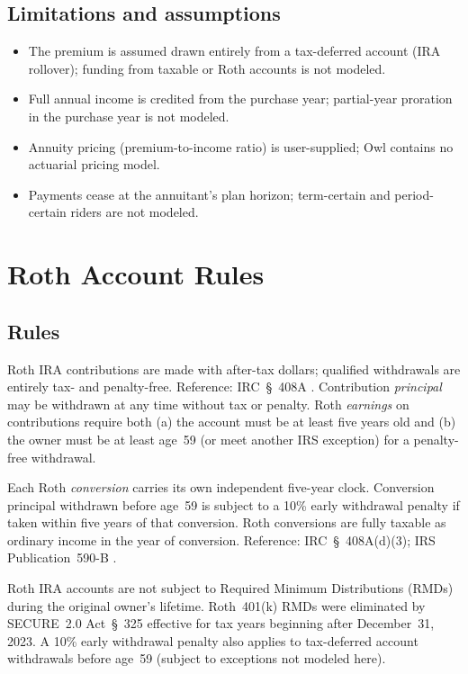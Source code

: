 \documentclass[fleqn,12pt]{report}
\begin{document}
\subsection*{Limitations and assumptions}

\begin{itemize}[nosep]
  \item The premium is assumed drawn entirely from a tax-deferred account (IRA
    rollover); funding from taxable or Roth accounts is not modeled.
  \item Full annual income is credited from the purchase year; partial-year
    proration in the purchase year is not modeled.
  \item Annuity pricing (premium-to-income ratio) is user-supplied; Owl
    contains no actuarial pricing model.
  \item Payments cease at the annuitant's plan horizon; term-certain and
    period-certain riders are not modeled.
\end{itemize}

\section{Roth Account Rules}
\label{sec:roth}

\subsection*{Rules}

Roth IRA contributions are made with after-tax dollars; qualified withdrawals
are entirely tax- and penalty-free.
Reference: IRC~§~408A \cite{irc408a}.
Contribution \emph{principal} may be withdrawn at any time without tax or
penalty.
Roth \emph{earnings} on contributions require both (a) the account must be at
least five years old and (b) the owner must be at least age~59\textonehalf{}
(or meet another IRS exception) for a penalty-free withdrawal.

Each Roth \emph{conversion} carries its own independent five-year clock.
Conversion principal withdrawn before age~59\textonehalf{} is subject to a
10\% early withdrawal penalty if taken within five years of that conversion.
Roth conversions are fully taxable as ordinary income in the year of
conversion.
Reference: IRC~§~408A(d)(3); IRS Publication~590-B \cite{irs590b}.

Roth IRA accounts are not subject to Required Minimum Distributions (RMDs)
during the original owner's lifetime.
Roth~401(k) RMDs were eliminated by SECURE~2.0 Act~§~325 effective for tax
years beginning after December~31, 2023.
A 10\% early withdrawal penalty also applies to tax-deferred account
withdrawals before age~59\textonehalf{} (subject to exceptions not modeled here).
\end{document}
